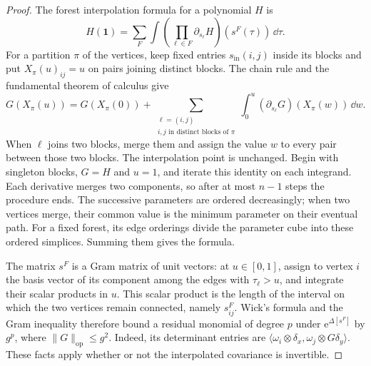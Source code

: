 \begin{proof}
The forest interpolation formula for a polynomial $H$ is
\[
 H(\mathbf1)=\sum_F\int
       \left(\prod_{\ell\in F}\partial_{s_\ell}H\right)
                                 (s^F(\tau))\,\dd\tau.
\]
For a partition $\pi$ of the vertices, keep fixed
entries $s_{\mathrm{in}}(i,j)$ inside its blocks and
put $X_\pi(u)_{ij}=u$ on pairs joining distinct blocks.
The chain rule and the fundamental theorem of calculus give
\begin{equation}\label{eq:interacting-forest-first-step}
 G(X_\pi(u))=G(X_\pi(0))
       +\sum_{\substack{\ell=(i,j)\\
                        i,j\text{ in distinct blocks of }\pi}}
          \int_0^u(\partial_{s_\ell}G)(X_\pi(w))\,\dd w .
\end{equation}
When $\ell$ joins two blocks, merge them and assign
the value $w$ to every pair between those two blocks.
The interpolation point is unchanged. Begin with singleton
blocks, $G=H$ and $u=1$, and iterate this identity
on each integrand. Each derivative
merges two components, so after at most $n-1$
steps the procedure ends. The successive
parameters are ordered decreasingly; when two
vertices merge, their common value is the
minimum parameter on their eventual path.
For a fixed forest, its edge orderings divide
the parameter cube into these ordered simplices.
Summing them gives the formula.

The matrix $s^F$ is a Gram matrix of unit
vectors: at $u\in[0,1]$, assign to vertex $i$
the basis vector of its component among the
edges with $\tau_\ell>u$, and integrate their
scalar products in $u$. This scalar product
is the length of the interval on which the
two vertices remain connected, namely
$s_{ij}^F$. Wick's formula and the Gram
inequality therefore bound a residual monomial
of degree $p$ under $\mathrm e^{\Delta[s^F]}$
by $g^p$, where $\|G\|_{\mathrm{op}}\le g^2$.
Indeed, its determinant entries are
$\langle\omega_i\otimes\delta_x,\omega_j\otimes G\delta_y\rangle$.
These facts apply whether or not the
interpolated covariance is invertible.


\end{proof}
